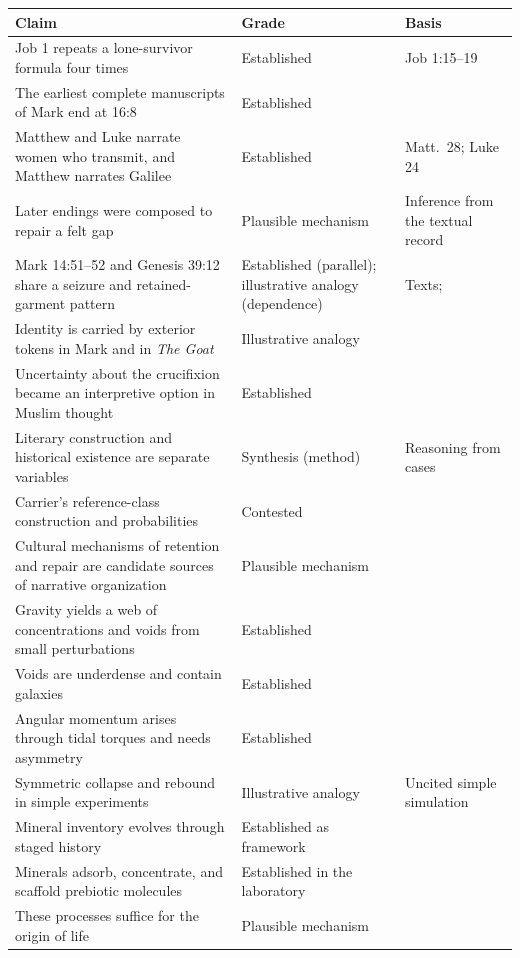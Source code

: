 \documentclass[11pt]{article}
\begin{document}
\begin{longtable}{p{}p{}p{}}
\hline
Claim & Grade & Basis \\
\hline
\endhead
Job 1 repeats a lone-survivor formula four times & Established & Job 1:15--19 \\
The earliest complete manuscripts of Mark end at 16:8 & Established & \cite{metzger} \\
Matthew and Luke narrate women who transmit, and Matthew narrates Galilee & Established & Matt.\ 28; Luke 24 \\
Later endings were composed to repair a felt gap & Plausible mechanism & Inference from the textual record \\
Mark 14:51--52 and Genesis 39:12 share a seizure and retained-garment pattern & Established (parallel); illustrative analogy (dependence) & Texts; \cite{scroggs} \\
Identity is carried by exterior tokens in Mark and in \emph{The Goat} & Illustrative analogy & \cite{goat} \\
Uncertainty about the crucifixion became an interpretive option in Muslim thought & Established & \cite{lawson} \\
Literary construction and historical existence are separate variables & Synthesis (method) & Reasoning from cases \\
Carrier's reference-class construction and probabilities & Contested & \cite{carrier1,carrier2,gullotta} \\
Cultural mechanisms of retention and repair are candidate sources of narrative organization & Plausible mechanism & \cite{lord,boyd,mesoudi} \\
Gravity yields a web of concentrations and voids from small perturbations & Established & \cite{bond} \\
Voids are underdense and contain galaxies & Established & \cite{vdw} \\
Angular momentum arises through tidal torques and needs asymmetry & Established & \cite{peebles,white} \\
Symmetric collapse and rebound in simple experiments & Illustrative analogy & Uncited simple simulation \\
Mineral inventory evolves through staged history & Established as framework & \cite{hazen2008} \\
Minerals adsorb, concentrate, and scaffold prebiotic molecules & Established in the laboratory & \cite{hazen2010} \\
These processes suffice for the origin of life & Plausible mechanism & \cite{hazen2010} \\

\end{longtable}
\end{document}
